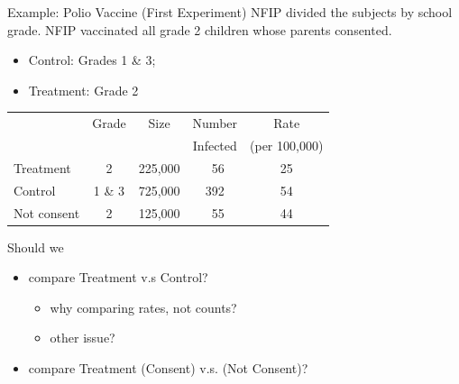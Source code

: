 \documentclass[
  ignorenonframetext, 10pt
]{beamer}
\providecommand{\tightlist}{%
  \setlength{\itemsep}{0pt}\setlength{\parskip}{0pt}}
\begin{document}
\begin{frame}{Example: Polio Vaccine (First Experiment)}
\protect\hypertarget{example-polio-vaccine-first-experiment}{}
NFIP divided the subjects by school grade. \newline NFIP vaccinated all
grade 2 children whose parents consented.

\begin{itemize}
\tightlist
\item
  Control: Grades 1 \& 3;
\item
  Treatment: Grade 2
\end{itemize}

\begin{center}
\begin{tabular}{lcccc}
  &Grade & Size & Number   & Rate\\[-3pt]
  &      &      & Infected & \footnotesize (per 100,000)\\
\midrule
Treatment  &  2      & 225,000 & ~56 & 25\\
Control    &  1 \& 3 & 725,000 & 392 & 54\\
Not consent&  2      & 125,000 & ~55 & 44
\end{tabular}
\end{center}
\end{frame}

\begin{frame}{}
\protect\hypertarget{section-1}{}
Should we

\begin{itemize}
\tightlist
\item
  compare Treatment v.s Control?

  \begin{itemize}
  \tightlist
  \item
    why comparing rates, not counts?
  \item
    other issue?
  \end{itemize}
\item
  compare Treatment (Consent) v.s. (Not Consent)?
\end{itemize}
\end{frame}
\end{document}
